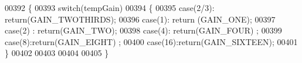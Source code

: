 \begin{DoxyCode}
00392 \{
00393     \textcolor{keywordflow}{switch}(tempGain)
00394     \{
00395         \textcolor{keywordflow}{case}(2/3): \textcolor{keywordflow}{return}(GAIN\_TWOTHIRDS);
00396         \textcolor{keywordflow}{case}(1): \textcolor{keywordflow}{return} (GAIN\_ONE);
00397         \textcolor{keywordflow}{case}(2) : \textcolor{keywordflow}{return}(GAIN\_TWO);
00398         \textcolor{keywordflow}{case}(4): \textcolor{keywordflow}{return}(GAIN\_FOUR) ;   
00399         \textcolor{keywordflow}{case}(8):\textcolor{keywordflow}{return}(GAIN\_EIGHT)  ;  
00400         \textcolor{keywordflow}{case}(16):\textcolor{keywordflow}{return}(GAIN\_SIXTEEN);  
00401     \}
00402 
00403 
00404 
00405 \}
\end{DoxyCode}
